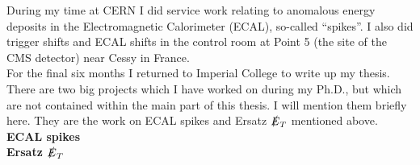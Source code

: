 During my time at CERN I did service work relating to anomalous energy deposits 
in the Electromagnetic Calorimeter (ECAL), so-called ``spikes''. I also did 
trigger shifts and ECAL shifts in the control room at Point 5 (the site of the 
CMS detector) near Cessy in France. \\

For the final six months I returned to Imperial College to write up my thesis.
\\

There are two big projects which I have worked on during my Ph.D., but which are
not contained within the main part of this thesis. I will mention them briefly
here. They are the work on ECAL spikes and Ersatz $\slashed{E}_{T}$ mentioned above. \\

{\bf ECAL spikes} \\

{\bf Ersatz $\slashed{E}_{T}$} \\
